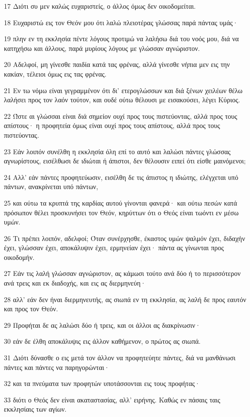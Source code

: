 \par 17 Διότι συ μεν καλώς ευχαριστείς, ο άλλος όμως δεν οικοδομείται.
\par 18 Ευχαριστώ εις τον Θεόν μου ότι λαλώ πλειοτέρας γλώσσας παρά πάντας υμάς·
\par 19 πλην εν τη εκκλησία πέντε λόγους προτιμώ να λαλήσω διά του νοός μου, διά να κατηχήσω και άλλους, παρά μυρίους λόγους με γλώσσαν αγνώριστον.
\par 20 Αδελφοί, μη γίνεσθε παιδία κατά τας φρένας, αλλά γίνεσθε νήπια μεν εις την κακίαν, τέλειοι όμως εις τας φρένας.
\par 21 Εν τω νόμω είναι γεγραμμένον ότι δι' ετερογλώσσων και διά ξένων χειλέων θέλω λαλήσει προς τον λαόν τούτον, και ουδέ ούτω θέλουσι με εισακούσει, λέγει Κύριος.
\par 22 Ώστε αι γλώσσαι είναι διά σημείον ουχί προς τους πιστεύοντας, αλλά προς τους απίστους· η προφητεία όμως είναι ουχί προς τους απίστους, αλλά προς τους πιστεύοντας.
\par 23 Εάν λοιπόν συνέλθη η εκκλησία όλη επί το αυτό και λαλώσι πάντες γλώσσας αγνωρίστους, εισέλθωσι δε ιδιώται ή άπιστοι, δεν θέλουσιν ειπεί ότι είσθε μαινόμενοι;
\par 24 Αλλ' εάν πάντες προφητεύωσιν, εισέλθη δε τις άπιστος η ιδιώτης, ελέγχεται υπό πάντων, ανακρίνεται υπό πάντων,
\par 25 και ούτω τα κρυπτά της καρδίας αυτού γίνονται φανερά· και ούτω πεσών κατά πρόσωπον θέλει προσκυνήσει τον Θεόν, κηρύττων ότι ο Θεός είναι τωόντι εν μέσω υμών.
\par 26 Τι πρέπει λοιπόν, αδελφοί; Όταν συνέρχησθε, έκαστος υμών ψαλμόν έχει, διδαχήν έχει, γλώσσαν έχει, αποκάλυψιν έχει, ερμηνείαν έχει· πάντα ας γίνωνται προς οικοδομήν.
\par 27 Εάν τις λαλή γλώσσαν αγνώριστον, ας κάμωσι τούτο ανά δύο ή το περισσότερον ανά τρεις και εκ διαδοχής, και εις ας διερμηνεύη·
\par 28 αλλ' εάν δεν ήναι διερμηνευτής, ας σιωπά εν τη εκκλησία, ας λαλή δε προς εαυτόν και προς τον Θεόν.
\par 29 Προφήται δε ας λαλώσι δύο ή τρεις, και οι άλλοι ας διακρίνωσιν·
\par 30 εάν δε έλθη αποκάλυψις εις άλλον καθήμενον, ο πρώτος ας σιωπά.
\par 31 Διότι δύνασθε ο εις μετά τον άλλον να προφητεύητε πάντες, διά να μανθάνωσι πάντες και πάντες να παρηγορώνται·
\par 32 και τα πνεύματα των προφητών υποτάσσονται εις τους προφήτας·
\par 33 διότι ο Θεός δεν είναι ακαταστασίας, αλλ' ειρήνης. Καθώς εν πάσαις ταις εκκλησίαις των αγίων.
